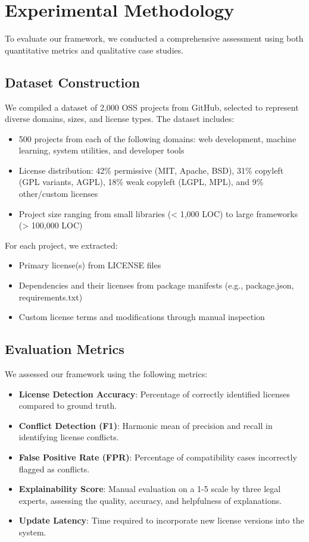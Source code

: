 \documentclass[12pt]{article}
\begin{document}
\section{Experimental Methodology}
\label{sec:methodology}

To evaluate our framework, we conducted a comprehensive assessment using both quantitative metrics and qualitative case studies.

\subsection{Dataset Construction}
We compiled a dataset of 2,000 OSS projects from GitHub, selected to represent diverse domains, sizes, and license types. The dataset includes:

\begin{itemize}
    \item 500 projects from each of the following domains: web development, machine learning, system utilities, and developer tools
    \item License distribution: 42\% permissive (MIT, Apache, BSD), 31\% copyleft (GPL variants, AGPL), 18\% weak copyleft (LGPL, MPL), and 9\% other/custom licenses
    \item Project size ranging from small libraries (< 1,000 LOC) to large frameworks (> 100,000 LOC)
\end{itemize}

For each project, we extracted:
\begin{itemize}
    \item Primary license(s) from LICENSE files
    \item Dependencies and their licenses from package manifests (e.g., package.json, requirements.txt)
    \item Custom license terms and modifications through manual inspection
\end{itemize}

\subsection{Evaluation Metrics}
We assessed our framework using the following metrics:

\begin{itemize}
    \item \textbf{License Detection Accuracy}: Percentage of correctly identified licenses compared to ground truth.
    \item \textbf{Conflict Detection (F1)}: Harmonic mean of precision and recall in identifying license conflicts.
    \item \textbf{False Positive Rate (FPR)}: Percentage of compatibility cases incorrectly flagged as conflicts.
    \item \textbf{Explainability Score}: Manual evaluation on a 1-5 scale by three legal experts, assessing the quality, accuracy, and helpfulness of explanations.
    \item \textbf{Update Latency}: Time required to incorporate new license versions into the system.
\end{itemize}
\end{document}
